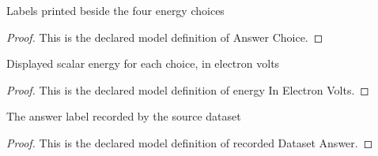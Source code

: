 \begin{definition}
  \label{def:physics:phyx-mini-0539:phyxminiproblems-problemphyxmini0539-answerchoice}
  Labels printed beside the four energy choices
\end{definition}
\begin{proof}
  This is the declared model definition of Answer Choice.
\end{proof}
\begin{definition}
  \label{def:physics:phyx-mini-0539:phyxminiproblems-problemphyxmini0539-answerchoice-energyinelectronvolts}
  Displayed scalar energy for each choice, in electron volts
\end{definition}
\begin{proof}
  This is the declared model definition of energy In Electron Volts.
\end{proof}
\begin{definition}
  \label{def:physics:phyx-mini-0539:phyxminiproblems-problemphyxmini0539-recordeddatasetanswer}
  The answer label recorded by the source dataset
\end{definition}
\begin{proof}
  This is the declared model definition of recorded Dataset Answer.
\end{proof}

